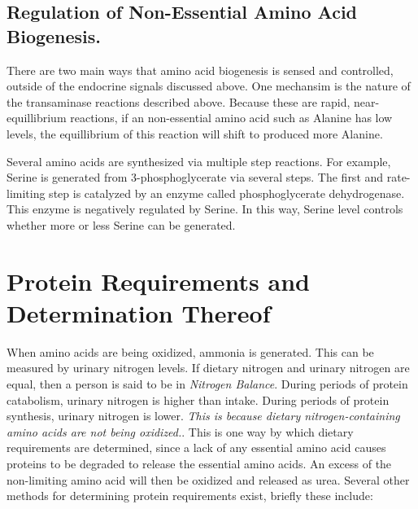 \documentclass{tufte-handout}
\begin{document}
\subsection{Regulation of Non-Essential Amino Acid Biogenesis.}

There are two main ways that amino acid biogenesis is sensed and controlled, outside of the endocrine signals discussed above.  One mechansim is the nature of the transaminase reactions described above.  Because these are rapid, near-equillibrium reactions, if an non-essential amino acid such as Alanine has low levels, the equillibrium of this reaction will shift to produced more Alanine.

  Several amino acids are synthesized via multiple step reactions.  For example, Serine is generated from 3-phosphoglycerate via several steps.  The first and rate-limiting step is catalyzed by an enzyme called phosphoglycerate dehydrogenase.  This enzyme is negatively regulated by Serine.  In this way, Serine level controls whether more or less Serine can be generated.


\section{Protein Requirements and Determination Thereof}
When amino acids are being oxidized, ammonia is generated. This can be measured by urinary nitrogen levels.  If dietary nitrogen and urinary nitrogen are equal, then a person is said to be in \emph{Nitrogen Balance}.  During periods of protein catabolism, urinary nitrogen is higher than intake.  During periods of protein synthesis, urinary nitrogen is lower.  \emph{This is because dietary nitrogen-containing amino acids are not being oxidized.}.  This is one way by which dietary requirements are determined, since a lack of any essential amino acid causes proteins to be degraded to release the essential amino acids.  An excess of the non-limiting amino acid will then be oxidized and released as urea.  Several other methods for determining protein requirements exist, briefly these include:
\end{document}
